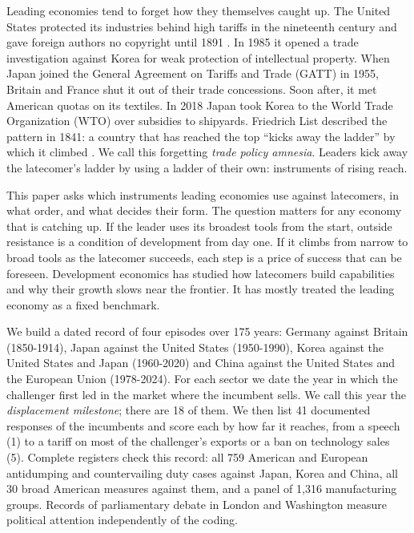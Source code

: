 \documentclass[review,authoryear,12pt]{elsarticle}
\begin{document}
Leading economies tend to forget how they themselves caught up. The United States protected its industries behind high tariffs in the nineteenth century \citep{chang2002} and gave foreign authors no copyright until 1891 \citep{khan2005}. In 1985 it opened a trade investigation against Korea for weak protection of intellectual property. When Japan joined the General Agreement on Tariffs and Trade (GATT) in 1955, Britain and France shut it out of their trade concessions. Soon after, it met American quotas on its textiles. In 2018 Japan took Korea to the World Trade Organization (WTO) over subsidies to shipyards. Friedrich List described the pattern in 1841: a country that has reached the top ``kicks away the ladder'' by which it climbed \citep[pp.~4-5]{chang2002}. We call this forgetting \emph{trade policy amnesia}. Leaders kick away the latecomer's ladder by using a ladder of their own: instruments of rising reach.

This paper asks which instruments leading economies use against latecomers, in what order, and what decides their form. The question matters for any economy that is catching up. If the leader uses its broadest tools from the start, outside resistance is a condition of development from day one. If it climbs from narrow to broad tools as the latecomer succeeds, each step is a price of success that can be foreseen. Development economics has studied how latecomers build capabilities and why their growth slows near the frontier. It has mostly treated the leading economy as a fixed benchmark.

We build a dated record of four episodes over 175 years: Germany against Britain (1850-1914), Japan against the United States (1950-1990), Korea against the United States and Japan (1960-2020) and China against the United States and the European Union (1978-2024). For each sector we date the year in which the challenger first led in the market where the incumbent sells. We call this year the \emph{displacement milestone}; there are 18 of them. We then list 41 documented responses of the incumbents and score each by how far it reaches, from a speech (1) to a tariff on most of the challenger's exports or a ban on technology sales (5). Complete registers check this record: all 759 American and European antidumping and countervailing duty cases against Japan, Korea and China, all 30 broad American measures against them, and a panel of 1,316 manufacturing groups. Records of parliamentary debate in London and Washington measure political attention independently of the coding.
\end{document}
